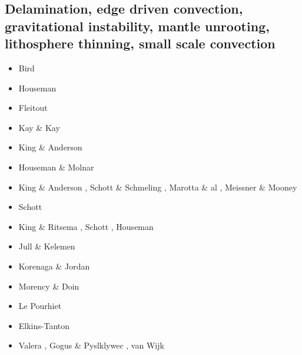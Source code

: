 \subsection{Delamination, edge driven convection, gravitational instability, mantle unrooting, lithosphere thinning, small scale convection} 

\begin{scriptsize}
\begin{itemize}
\item[\nineteenseventynine] Bird \cite{bird79}
\item[\nineteeneightyone] Houseman \etal \cite{homm81}
\item[\nineteeneightysix] Fleitout \etal \cite{flfy86}
\item[\nineteenninetythree] Kay \& Kay \cite{kaka93} 
\item[\nineteenninetyfive] King \& Anderson \cite{kian95}
\item[\nineteenninetyseven] Houseman \& Molnar \cite{homo97}
\item[\nineteenninetyeight] King \& Anderson \cite{kian98}, Schott \& Schmeling \cite{scsc98}, 
                            Marotta \& al \cite{mafs98}, Meissner \& Mooney \cite{memo98}
\item[\nineteenninetynine] Schott \etal \cite{scys99} 
\item[\twothousand] King \& Ritsema \cite{kiri00}, Schott \etal \cite{scys00}, 
                    Houseman \etal \cite{honk00}
\item[\twothousandone] Jull \& Kelemen \cite{juke01}
\item[\twothousandthree] Korenaga \& Jordan \cite{kojo03} 
\item[\twothousandfour] Morency \& Doin \cite{modo04}
\item[\twothousandsix] Le Pourhiet \etal \cite{legs06}
\item[\twothousandseven] Elkins-Tanton \cite{elki07}
\item[\twothousandeight] Valera \etal \cite{vanv08}, Gogus \& Pyslklywec \cite{gopy08}, 
                         van Wijk \etal \cite{vavg08}

\end{itemize}
\end{scriptsize}
